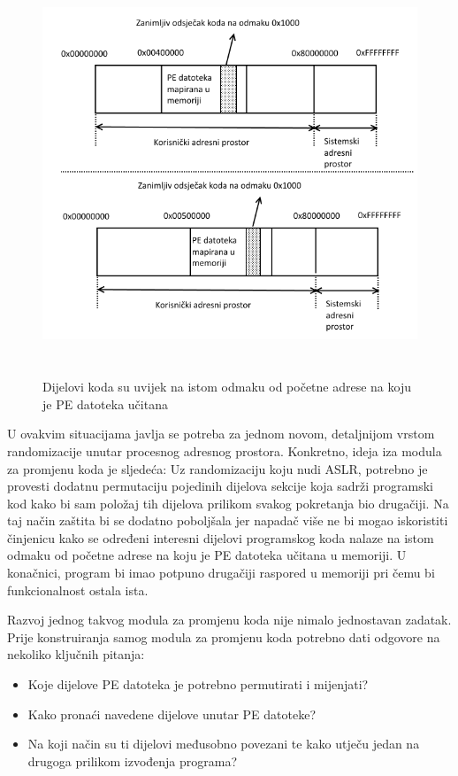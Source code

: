\documentclass[times, utf8, diplomski, numeric]{fer}
\begin{document}
\begin{figure}[!htb]
\centering
\setlength\fboxsep{0pt}
\setlength\fboxrule{0.5pt}
\includegraphics[width=12cm, height=12cm]{slike/aslr_permutacija}
\caption{Dijelovi koda su uvijek na istom odmaku od početne adrese na koju je PE datoteka učitana}
\label{fig:aslr_permutacija} 
\end{figure}
U ovakvim situacijama javlja se potreba za jednom novom, detaljnijom vrstom randomizacije unutar procesnog adresnog prostora. Konkretno, ideja iza modula za promjenu koda je sljedeća: Uz randomizaciju koju nudi ASLR, potrebno je provesti dodatnu permutaciju pojedinih dijelova sekcije koja sadrži programski kod kako bi sam položaj tih dijelova prilikom svakog pokretanja bio drugačiji. Na taj način zaštita bi se dodatno poboljšala jer napadač više ne bi mogao iskoristiti činjenicu kako se određeni interesni dijelovi programskog koda nalaze na istom odmaku od početne adrese na koju je PE datoteka učitana u memoriji. U konačnici, program bi imao potpuno drugačiji raspored u memoriji pri čemu bi funkcionalnost ostala ista.

Razvoj jednog takvog modula za promjenu koda nije nimalo jednostavan zadatak. Prije konstruiranja samog modula za promjenu koda potrebno dati odgovore na nekoliko ključnih pitanja:
\begin{itemize}
\item Koje dijelove PE datoteka je potrebno permutirati i mijenjati?
\item Kako pronaći navedene dijelove unutar PE datoteke?
\item Na koji način su ti dijelovi međusobno povezani te kako utječu jedan na drugoga prilikom izvođenja programa?
\end{itemize}
\end{document}

